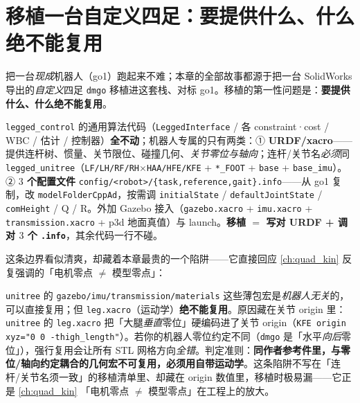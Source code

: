 \section{移植一台自定义四足：要提供什么、什么绝不能复用}
\label{sec:qadv-port}

把一台\emph{现成}机器人（go1）跑起来不难；本章的全部故事都源于把一台 SolidWorks 导出的\emph{自定义}四足 \texttt{dmgo} 移植进这套栈、对标 go1。移植的第一性问题是：\textbf{要提供什么、什么绝不能复用}。

\begin{insight}\label{ins:qadv-port-boundary}
\texttt{legged\_control} 的通用算法代码（\texttt{LeggedInterface} / 各 constraint·cost / WBC / 估计 / 控制器）\textbf{全不动}；机器人专属的只有两类：① \textbf{URDF/xacro}——提供连杆树、惯量、关节限位、碰撞几何、\emph{关节零位与轴向}；连杆/关节名\emph{必须}同 \texttt{legged\_unitree}（\texttt{LF/LH/RF/RH}$\times$\texttt{HAA/HFE/KFE} + \texttt{*\_FOOT} + \texttt{base} + \texttt{base\_imu}）。② \textbf{$3$ 个配置文件} \texttt{config/<robot>/\{task,reference,gait\}.info}——从 go1 复制，改 \texttt{modelFolderCppAd}，按需调 \texttt{initialState} / \texttt{defaultJointState} / \texttt{comHeight} / Q / R。外加 Gazebo 接入（\texttt{gazebo.xacro} + \texttt{imu.xacro} + \texttt{transmission.xacro} + p3d 地面真值）与 launch。\textbf{移植 $=$ 写对 URDF + 调对 $3$ 个 \texttt{.info}}，其余代码一行不碰。
\end{insight}

这条边界看似清爽，却藏着本章最贵的一个陷阱——它直接回应 \cref{ch:quad_kin} 反复强调的「电机零点 $\neq$ 模型零点」：

\begin{insight}\label{ins:qadv-leg-noreuse}
\texttt{unitree} 的 \texttt{gazebo/imu/transmission/materials} 这些薄包宏是\emph{机器人无关}的，可以直接复用；但 \texttt{leg.xacro}（运动学）\textbf{绝不能复用}。原因藏在关节 origin 里：\texttt{unitree} 的 \texttt{leg.xacro} 把「大腿\emph{垂直}零位」硬编码进了关节 origin（\texttt{KFE origin xyz="0 0 -thigh\_length"}）。若你的机器人零位约定不同（\texttt{dmgo} 是「水平\emph{向后}零位」），强行复用会让所有 STL 网格方向\emph{全错}。判定准则：\textbf{同作者参考件里，与零位/轴向约定耦合的几何宏不可复用，必须用自带运动学}。这条陷阱不写在「连杆/关节名须一致」的移植清单里、却藏在 origin 数值里，移植时极易漏——它正是 \cref{ch:quad_kin} 「电机零点 $\neq$ 模型零点」在工程上的放大。
\end{insight}


